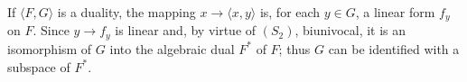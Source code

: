 If $\langle F, G \rangle$ is a duality, the mapping $x \rightarrow \langle x, y \rangle$ is, for each $y \in G$, a linear form $f_y$ on $F$. Since $y \rightarrow f_y$ is linear and, by virtue of $(S_2)$, biunivocal, it is an isomorphism of $G$ into the algebraic dual $F^*$ of $F$; thus $G$ can be identified with a subspace of $F^*$.
